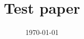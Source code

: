 \documentclass[english,a4paper,12pt]{article}
\title{
	Test paper%
}
\author{}
\date{\today}
\begin{document}
\begin{titlepage}
  \maketitle

	\begin{abstract}
		\noindent

	\end{abstract}

\end{titlepage}




\clearpage
\renewcommand*{\bibfont}{\small}
\printbibliography



\end{document}
